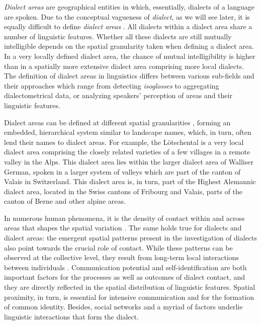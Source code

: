 \documentclass[output=paper]{langscibook}
\begin{document}
\textit{Dialect areas} are geographical entities in which, essentially, dialects of a language are spoken. Due to the conceptual vagueness of \textit{dialect}, as we will see later, it is equally difficult to define \textit{dialect areas} \parencite[514--517]{Stoeckle2014}. All dialects within a dialect area share a number of linguistic features. Whether all these dialects are still mutually intelligible depends on the spatial granularity taken when defining a dialect area. In a very locally defined dialect area, the chance of mutual intelligibility is higher than in a spatially more extensive dialect area comprising more local dialects. The definition of dialect areas in linguistics differs between various sub-fields and their approaches which range from detecting \textit{isoglosses} to aggregating dialectometrical data, or analyzing speakers’ perception of areas and their linguistic features.

Dialect areas can be defined at different spatial granularities \parencite[e.g.,][]{Montgomery2013}, forming an embedded, hierarchical system similar to landscape names, which, in turn, often lend their names to dialect areas. For example, the Lötschental is a very local dialect area comprising the closely related varieties of a few villages in a remote valley in the Alps. This dialect area lies within the larger dialect area of Walliser German, spoken in a larger system of valleys which are part of the canton of Valais in Switzerland. This dialect area is, in turn, part of the Highest Alemannic dialect area, located in the Swiss cantons of Fribourg and Valais, parts of the canton of Berne and other alpine areas.

In numerous human phenomena, it is the density of contact within and across areas that shapes the spatial variation  \parencite[cf.][]{Hagerstrand1952}. The same holds true for dialects and dialect areas: the emergent spatial patterns present in the investigation of dialects also point towards the crucial role of contact. 
While these patterns can be observed at the collective level, they result from long-term local interactions between individuals \parencite[cf.][]{Beckner2009}. Communication potential and self-identification are both important factors for the processes as well as outcomes of dialect contact, and they are directly reflected in the spatial distribution of linguistic features. Spatial proximity, in turn, is essential for intensive communication and for the formation of common identity. Besides, social networks and a myriad of factors underlie linguistic interactions that form the dialect.
\end{document}
